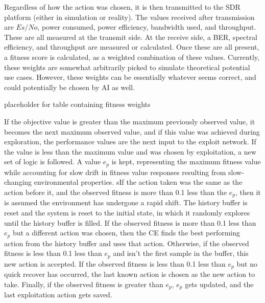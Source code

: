 \par Regardless of how the action was chosen, it is then transmitted to the SDR platform (either in simulation or reality). The values received after transmission are $Es/No$, power consumed, power efficiency, bandwidth used, and throughput. These are all measured at the transmit side. At the receive side, a BER, spectral efficiency, and throughput are measured or calculated. Once these are all present, a fitness score is calculated, as a weighted combination of these values. Currently, these weights are somewhat arbitrarily picked to simulate theoretical potential use cases. However, these weights can be essentially whatever seems correct, and could potentially be chosen by AI as well. 
\begin{table}
\caption{placeholder for table containing fitness weights}
\end{table}
\par If the objective value is greater than the maximum previously observed value, it becomes the next maximum observed value, and if this value was achieved during exploration, the performance values are the next input to the exploit network. If the value is less than the maximum value and was chosen by exploitation, a new set of logic is followed. A value $e_p$ is kept, representing the maximum fitness value while accounting for slow drift in fitness value responses resulting from slow-changing environmental properties. sIf the action taken was the same as the action before it, and the observed fitness is more than 0.1 less than the $e_p$, then it is assumed the environment has undergone a rapid shift. The history buffer is reset and the system is reset to the initial state, in which it randomly explores until the history buffer is filled.  If the observed fitness is more than 0.1 less than $e_p$ but a different action was chosen, then the CE finds the best performing action from the history buffer and uses that action. Otherwise, if the observed fitness is less than 0.1 less than $e_p$ and isn't the first sample in the buffer, this new action is accepted. If the observed fitness is less than 0.1 less than $e_p$ but no quick recover has occurred, the last known action is chosen as the new action to take. Finally, if the observed fitness is greater than $e_p$, $e_p$ gets updated, and the last exploitation action gets saved. 


